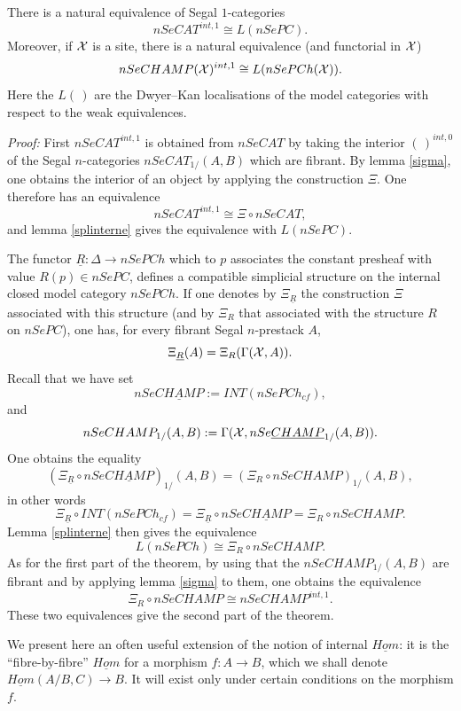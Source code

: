 \begin{theorem}
\label{intereqloc}
There is a natural equivalence of Segal $1$-categories
$$
nSeCAT ^{int,1} \cong L(nSePC ).
$$
Moreover,
if ${\cal X}$ is a site, there is a natural equivalence (and functorial in
${\cal X}$)
$$
nSeCHAMP ({\cal X} )^{int, 1} \cong L(nSePCh({\cal X} )).
$$
Here the $L(\, )$ are the Dwyer--Kan localisations of the model
categories with respect to the weak equivalences.
\end{theorem}
{\em Proof:}
First $nSeCAT ^{int,1}$ is obtained from $nSeCAT$ by taking
the interior $(\, )^{int, 0}$ of the Segal $n$-categories $nSeCAT _{1/}(A,B)$
which are fibrant.
By lemma \ref{sigma}, one obtains the interior of an object
by applying the construction $\Xi$. One therefore has an equivalence
$$
nSeCAT ^{int,1}\cong \Xi \circ nSeCAT,
$$
and lemma \ref{splinterne} gives the equivalence with
$L(nSePC)$.

The functor $\underline{R}: \Delta \rightarrow nSePCh$ which to $p$
associates the constant presheaf with value $R(p)\in nSePC$,
defines a compatible
simplicial structure on the internal closed model category
$nSePCh$. If one denotes by $\Xi _{\underline{R}}$ the construction $\Xi$
associated with this structure (and by $\Xi _R$ that associated with the
structure $R$ on $nSePC$), one has, for every fibrant Segal $n$-prestack $A$,
$$
\Xi _{\underline{R}}(A) = \Xi _R (\Gamma ({\cal X} , A)).
$$
Recall that we have set
$$
nSe\underline{CHAMP} := INT (nSePCh_{cf}),
$$
and
$$
nSeCHAMP _{1/} (A, B) := \Gamma ({\cal X} , nSe\underline{CHAMP}_{1/}(A,B)).
$$
One obtains the equality
$$
(\Xi _{\underline{R}}\circ nSe\underline{CHAMP})_{1/}(A,B)
= (\Xi _R \circ nSeCHAMP )_{1/}(A,B),
$$
in other words
$$
\Xi _{\underline{R}}\circ INT (nSePCh_{cf} )=
\Xi _{\underline{R}}\circ nSe\underline{CHAMP}=
\Xi _R \circ nSeCHAMP.
$$
Lemma \ref{splinterne} then gives the equivalence
$$
L(nSePCh )\cong \Xi _R \circ nSeCHAMP.
$$
As for the first part of the theorem, by
using that the $nSeCHAMP
_{1/}(A,B)$ are fibrant and by applying lemma \ref{sigma} to them, one
obtains the equivalence
$$
\Xi _R \circ nSeCHAMP\cong  nSeCHAMP ^{int, 1}.
$$
These two equivalences give the second part of the theorem.
\eop



We present here an often useful extension of the notion of
internal $\underline{Hom}$: it is the ``fibre-by-fibre'' $\underline{Hom}$ for a morphism
$f:A\rightarrow B$, which we shall denote $\underline{Hom}(A/B, C)\rightarrow B$. It
will exist only under certain conditions on the morphism $f$.

